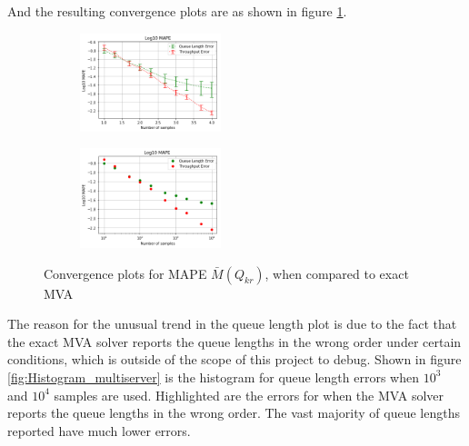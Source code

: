And the resulting convergence plots are as shown in figure \ref{fig:Convergence_multiserver}.

\begin{figure}[!htb]
\begin{center}
\begin{subfigure}
    \centering
    \includegraphics[width=0.45\textwidth]{Chap6_EvaluationAndAnalysis/multiserver/convergence_MS.png}
\end{subfigure}
\begin{subfigure}
    \centering
    \includegraphics[width=0.45\textwidth]{Chap6_EvaluationAndAnalysis/multiserver/convergence_MS_meanerr.png}
\end{subfigure}
\caption{ Convergence plots for MAPE \(\bar{M}(Q_{kr})\), when compared to exact MVA}
\label{fig:Convergence_multiserver}
\end{center}
\end{figure}

The reason for the unusual trend in the queue length plot is due to the fact that the exact MVA solver reports the queue lengths in the wrong order under certain conditions, which is outside of the scope of this project to debug. Shown in figure \ref{fig:Histogram_multiserver} is the histogram for queue length errors when \(10^3\) and \(10^4\) samples are used. Highlighted are the errors for when the MVA solver reports the queue lengths in the wrong order. The vast majority of queue lengths reported have much lower errors.

